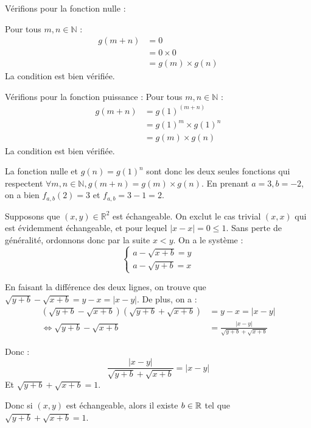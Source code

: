 \documentclass[]{../templates/homework}
\begin{document}
Vérifions pour la fonction nulle :

Pour tous $m, n \in \mathbb{N}$ :
\begin{align*}
	g(m + n) &= 0 \\
	&= 0 \times 0 \\
	&= g(m) \times g(n)
\end{align*}
La condition est bien vérifiée.

Vérifions pour la fonction puissance :
Pour tous $m, n \in \mathbb{N}$ :
\begin{align*}
	g(m + n) &= g(1)^{(m + n)} \\
	&= g(1)^m \times g(1)^n \\
	&= g(m) \times g(n)
\end{align*}
La condition est bien vérifiée.

La fonction nulle et $g(n) = g(1)^n$ sont donc les deux seules fonctions qui respectent $\forall m, n \in \mathbb{N}, g(m + n) = g(m) \times g(n)$.
\subproblem
En prenant $a = 3, b=-2$, on a bien $f_{a,b}(2) = 3$ et $f_{a,b} = 3-1 = 2$.
\subproblem

Supposons que $(x,y) \in \mathbb R^2$ est échangeable. On exclut le cas trivial $(x,x)$ qui est évidemment échangeable, et pour lequel $|x-x| = 0 \leq 1$. Sans perte de généralité, ordonnons donc par la suite $x < y$. On a le système :
\begin{equation*}
	\begin{cases}
		a - \sqrt{x+b} = y \\
		a - \sqrt{y+b} = x
	\end{cases}
\end{equation*}

En faisant la différence des deux lignes, on trouve que $\sqrt{y+b} - \sqrt{x+b} = y-x = |x-y|$. De plus, on a :
\begin{equation*}
	\begin{split}
		(\sqrt{y+b} - \sqrt{x+b})(\sqrt{y+b} + \sqrt{x+b}) & =y-x = |x-y|                             \\
		\iff \sqrt{y+b} - \sqrt{x+b}                       & = \frac {|x-y|}{\sqrt{y+b} + \sqrt{x+b}}
	\end{split}
\end{equation*}

Donc : $$\frac {|x-y|}{\sqrt{y+b} + \sqrt{x+b}} = |x-y|$$
Et $\sqrt{y+b} + \sqrt{x+b} = 1$.

Donc si $(x,y)$ est échangeable, alors il existe $b\in\mathbb R$ tel que $\sqrt{y+b} + \sqrt{x+b} = 1$.
\end{document}
